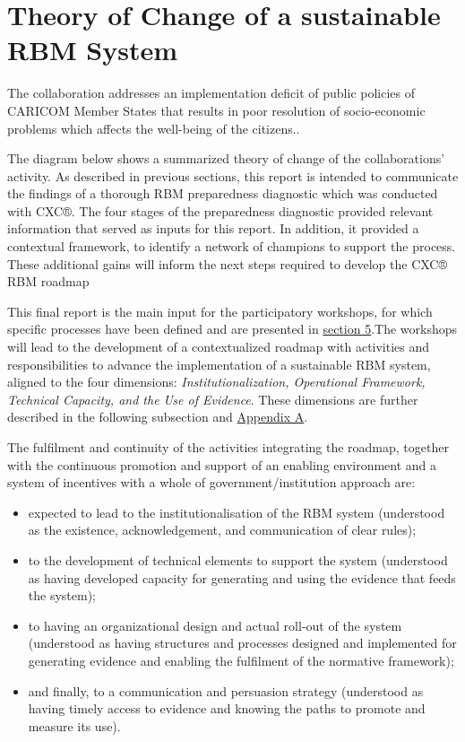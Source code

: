 \documentclass[
  10pt,
]{book}
\begin{document}
\hypertarget{theory-of-change-of-a-sustainable-rbm-system}{%
\section{Theory of Change of a sustainable RBM System}\label{theory-of-change-of-a-sustainable-rbm-system}}

The collaboration addresses an implementation deficit of public policies of CARICOM Member States that results in poor resolution of socio-economic problems which affects the well-being of the citizens..

The diagram below shows a summarized theory of change of the collaborations' activity. As described in previous sections, this report is intended to communicate the findings of a thorough RBM preparedness diagnostic which was conducted with CXC®. The four stages of the preparedness diagnostic provided relevant information that served as inputs for this report. In addition, it provided a contextual framework, to identify a network of champions to support the process. These additional gains will inform the next steps required to develop the CXC® RBM roadmap

This final report is the main input for the participatory workshops, for which specific processes have been defined and are presented in \protect\hyperlink{section5}{section 5}.The workshops will lead to the development of a contextualized roadmap with activities and responsibilities to advance the implementation of a sustainable RBM system, aligned to the four dimensions: \emph{Institutionalization, Operational Framework, Technical Capacity, and the Use of Evidence}. These dimensions are further described in the following subsection and \protect\hyperlink{appendixA}{Appendix A}.

The fulfilment and continuity of the activities integrating the roadmap, together with the continuous promotion and support of an enabling environment and a system of incentives with a whole of government/institution approach are:

\begin{itemize}
\item
  expected to lead to the institutionalisation of the RBM system (understood as the existence, acknowledgement, and communication of clear rules);
\item
  to the development of technical elements to support the system (understood as having developed capacity for generating and using the evidence that feeds the system);
\item
  to having an organizational design and actual roll-out of the system (understood as having structures and processes designed and implemented for generating evidence and enabling the fulfilment of the normative framework);
\item
  and finally, to a communication and persuasion strategy (understood as having timely access to evidence and knowing the paths to promote and measure its use).
\end{itemize}
\end{document}
